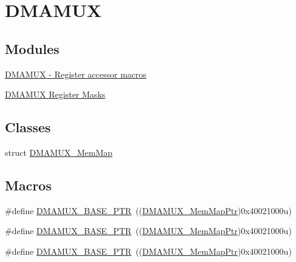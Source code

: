 \hypertarget{group___d_m_a_m_u_x___peripheral}{}\section{D\+M\+A\+M\+UX}
\label{group___d_m_a_m_u_x___peripheral}
\subsection*{Modules}
\begin{DoxyCompactItemize}
\item 
\hyperlink{group___d_m_a_m_u_x___register___accessor___macros}{D\+M\+A\+M\+U\+X -\/ Register accessor macros}
\item 
\hyperlink{group___d_m_a_m_u_x___register___masks}{D\+M\+A\+M\+U\+X Register Masks}
\end{DoxyCompactItemize}
\subsection*{Classes}
\begin{DoxyCompactItemize}
\item 
struct \hyperlink{struct_d_m_a_m_u_x___mem_map}{D\+M\+A\+M\+U\+X\+\_\+\+Mem\+Map}
\end{DoxyCompactItemize}
\subsection*{Macros}
\begin{DoxyCompactItemize}
\item 
\#define \hyperlink{group___d_m_a_m_u_x___peripheral_gad38c261e5de04658dbad762d40e8904e}{D\+M\+A\+M\+U\+X\+\_\+\+B\+A\+S\+E\+\_\+\+P\+TR}~((\hyperlink{group___d_m_a_m_u_x___peripheral_ga736ab5b1ed284b3b4fdb63010a576777}{D\+M\+A\+M\+U\+X\+\_\+\+Mem\+Map\+Ptr})0x40021000u)
\item 
\#define \hyperlink{group___d_m_a_m_u_x___peripheral_gad38c261e5de04658dbad762d40e8904e}{D\+M\+A\+M\+U\+X\+\_\+\+B\+A\+S\+E\+\_\+\+P\+TR}~((\hyperlink{group___d_m_a_m_u_x___peripheral_ga736ab5b1ed284b3b4fdb63010a576777}{D\+M\+A\+M\+U\+X\+\_\+\+Mem\+Map\+Ptr})0x40021000u)
\item 
\#define \hyperlink{group___d_m_a_m_u_x___peripheral_gad38c261e5de04658dbad762d40e8904e}{D\+M\+A\+M\+U\+X\+\_\+\+B\+A\+S\+E\+\_\+\+P\+TR}~((\hyperlink{group___d_m_a_m_u_x___peripheral_ga736ab5b1ed284b3b4fdb63010a576777}{D\+M\+A\+M\+U\+X\+\_\+\+Mem\+Map\+Ptr})0x40021000u)
\end{DoxyCompactItemize}

